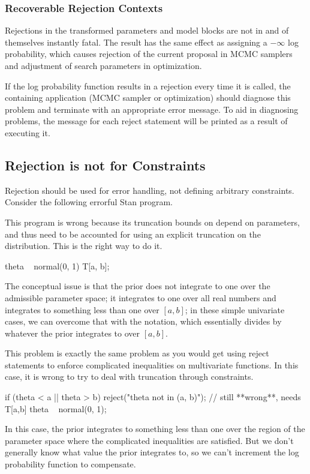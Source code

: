 \subsubsection{Recoverable Rejection Contexts}

Rejections in the transformed parameters and model blocks are
not in and of themselves instantly fatal.  The result has the same
effect as assigning a $-\infty$ log probability, which causes
rejection of the current proposal in MCMC samplers and adjustment of
search parameters in optimization.

If the log probability function results in a rejection every time it is
called, the containing application (MCMC sampler or optimization)
should diagnose this problem and terminate with an appropriate error
message.  To aid in diagnosing problems, the message for each
reject statement will be printed as a result of executing it.


\subsection{Rejection is not for Constraints}

Rejection should be used for error handling, not defining arbitrary
constraints.  Consider the following errorful Stan program.
%
\begin{stancode}
parameters {
  real a;
  real<lower=a> b;
  real<lower=a, upper=b> theta;
  ...
model {
  // **wrong** needs explicit truncation
  theta ~ normal(0, 1);
  ...
\end{stancode}
%
This program is wrong because its truncation bounds on 
depend on parameters, and thus need to be accounted for using an
explicit truncation on the distribution.  This is the right way to do
it.
%
\begin{stancode}
  theta ~ normal(0, 1) T[a, b];
\end{stancode}
%
The conceptual issue is that the prior does not integrate to one over
the admissible parameter space; it integrates to one over all real
numbers and integrates to something less than one over $[a ,b]$; in
these simple univariate cases, we can overcome that with the
 notation, which essentially divides by whatever the
prior integrates to over $[a, b]$.

This problem is exactly the same problem as you would get using reject
statements to enforce complicated inequalities on multivariate
functions.  In this case, it is wrong to try to deal with truncation
through constraints.
%
\begin{stancode}
  if (theta < a || theta > b)
    reject("theta not in (a, b)");
  // still **wrong**, needs T[a,b]
  theta ~ normal(0, 1);
\end{stancode}
%
In this case, the prior integrates to something less than one over the
region of the parameter space where the complicated inequalities are
satisfied. But we don't generally know what value the prior integrates
to, so we can't increment the log probability function to compensate.

